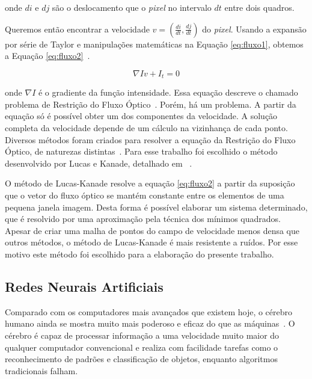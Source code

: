 \noindent onde $di$ e $dj$ são o deslocamento que o \textit{pixel} no intervalo $dt$ entre dois quadros.

Queremos então encontrar a velocidade $v =(\frac{di}{dt},\frac{dj}{dt})$ do \textit{pixel}. Usando a expansão por série de Taylor e manipulações matemáticas na Equação \ref{eq:fluxo1}, obtemos a Equação \ref{eq:fluxo2}~\cite{faria1992fluxo}.

\begin{equation}
	\nabla Iv + I_t = 0
\label{eq:fluxo2}
\end{equation}

\noindent onde $\nabla I$ é o gradiente da função intensidade. Essa equação descreve o chamado problema de Restrição do Fluxo Óptico~\cite{mota2011tensor}. Porém, há um problema. A partir da equação só é possível obter um dos componentes da velocidade. A solução completa da velocidade depende de um cálculo na vizinhança de cada ponto. Diversos métodos foram criados para resolver a equação da Restrição do Fluxo Óptico, de naturezas distintas~\cite{mota2011tensor}. Para esse trabalho foi escolhido o método desenvolvido por Lucas e Kanade, detalhado em ~\cite{bruhn2005lucas,faria1992fluxo,mota2011tensor}.

O método de Lucas-Kanade resolve a equação \ref{eq:fluxo2} a partir da suposição que o vetor do fluxo óptico se mantém constante entre os elementos de uma pequena janela imagem. Desta forma é possível elaborar um sistema determinado, que é resolvido por uma aproximação pela técnica dos mínimos quadrados. Apesar de criar uma malha de pontos do campo de velocidade menos densa que outros métodos, o método de Lucas-Kanade é mais resistente a ruídos. Por esse motivo este método foi escolhido para a elaboração do presente trabalho.




\subsection{Redes Neurais Artificiais} \label{cap:redes}

Comparado com os computadores mais avançados que existem hoje, o cérebro humano ainda se mostra muito mais poderoso e eficaz do que as máquinas~\cite{Haykin}. O cérebro é capaz de processar informação a uma velocidade muito maior do qualquer computador convencional e realiza com facilidade tarefas como o reconhecimento de padrões e classificação de objetos, enquanto algoritmos tradicionais falham. 

